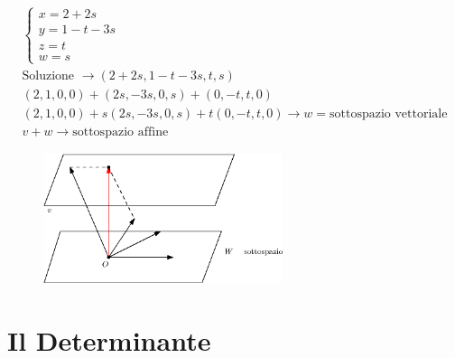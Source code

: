 \begin{eqnarray*}
  \begin{cases}
    x=2+2s\\
    y=1-t-3s\\
    z=t\\
    w=s
  \end{cases}\\
  \text{Soluzione } \to (2+2s,1-t-3s,t,s)\\
  (2,1,0,0)+(2s,-3s,0,s)+(0,-t,t,0)\\
  \boxed{(2,1,0,0)+s(2s,-3s,0,s)+t(0,-t,t,0)} \to w=\text{sottospazio vettoriale}\\
  \boxed{v+w}\to \text{sottospazio affine}
\end{eqnarray*}
\begin{figure}[ht]
    \centering
    \includegraphics[width=7cm]{img/finiti/es/es2.eps}
\end{figure}

\section{Il Determinante}
\label{sec:ildeterminante}

